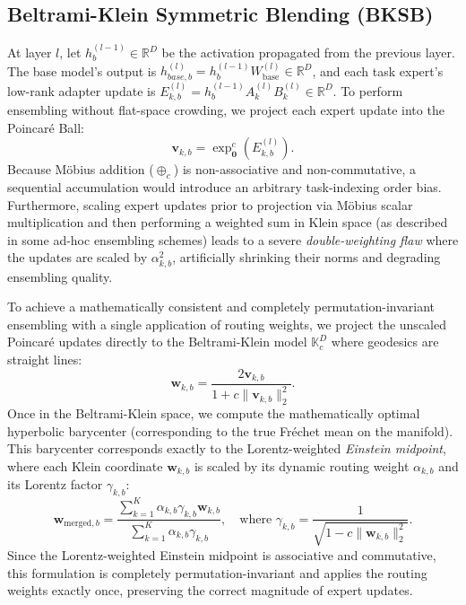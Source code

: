 \subsection{Beltrami-Klein Symmetric Blending (BKSB)}
At layer $l$, let $h_b^{(l-1)} \in \mathbb{R}^D$ be the activation propagated from the previous layer. The base model's output is $h_{base, b}^{(l)} = h_b^{(l-1)} W_{\text{base}}^{(l)} \in \mathbb{R}^D$, and each task expert's low-rank adapter update is $E_{k, b}^{(l)} = h_b^{(l-1)} A_k^{(l)} B_k^{(l)} \in \mathbb{R}^D$.
To perform ensembling without flat-space crowding, we project each expert update into the Poincaré Ball:
\begin{equation}
\mathbf{v}_{k, b} = \exp_{\mathbf{0}}^c\left( E_{k, b}^{(l)} \right).
\end{equation}
Because Möbius addition ($\oplus_c$) is non-associative and non-commutative, a sequential accumulation would introduce an arbitrary task-indexing order bias. Furthermore, scaling expert updates prior to projection via Möbius scalar multiplication and then performing a weighted sum in Klein space (as described in some ad-hoc ensembling schemes) leads to a severe \emph{double-weighting flaw} where the updates are scaled by $\alpha_{k, b}^2$, artificially shrinking their norms and degrading ensembling quality.

To achieve a mathematically consistent and completely permutation-invariant ensembling with a single application of routing weights, we project the unscaled Poincaré updates directly to the Beltrami-Klein model $\mathbb{K}_c^D$ where geodesics are straight lines:
\begin{equation}
\mathbf{w}_{k, b} = \frac{2 \mathbf{v}_{k, b}}{1 + c \|\mathbf{v}_{k, b}\|_2^2}.
\end{equation}
Once in the Beltrami-Klein space, we compute the mathematically optimal hyperbolic barycenter (corresponding to the true Fréchet mean on the manifold). This barycenter corresponds exactly to the Lorentz-weighted \emph{Einstein midpoint}, where each Klein coordinate $\mathbf{w}_{k, b}$ is scaled by its dynamic routing weight $\alpha_{k, b}$ and its Lorentz factor $\gamma_{k, b}$:
\begin{equation}
\mathbf{w}_{\text{merged}, b} = \frac{\sum_{k=1}^K \alpha_{k, b} \gamma_{k, b} \mathbf{w}_{k, b}}{\sum_{k=1}^K \alpha_{k, b} \gamma_{k, b}}, \quad \text{where } \gamma_{k, b} = \frac{1}{\sqrt{1 - c \|\mathbf{w}_{k, b}\|_2^2}}.
\end{equation}
Since the Lorentz-weighted Einstein midpoint is associative and commutative, this formulation is completely permutation-invariant and applies the routing weights exactly once, preserving the correct magnitude of expert updates.

